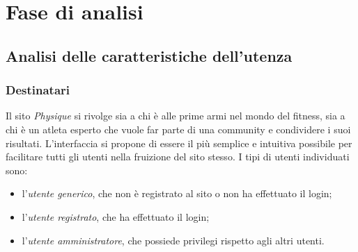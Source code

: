 \section{Fase di analisi}
\subsection{Analisi delle caratteristiche dell'utenza}
\label{sub:analisi_delle_caratteristiche_dell_utenza}
\subsubsection{Destinatari}
\label{subs:destinatari}
Il sito \emph{Physique} si rivolge sia a chi è alle prime armi nel mondo del fitness, sia a chi è un atleta esperto che vuole far parte di una community e condividere i suoi risultati. 
L'interfaccia si propone di essere il più semplice e intuitiva possibile per facilitare tutti gli utenti nella fruizione del sito stesso. I tipi di utenti individuati sono:
\begin{itemize}
    \item l'\textit{utente generico}, che non è registrato al sito o non ha effettuato il login;
    \item l'\textit{utente registrato}, che ha effettuato il login;
    \item l'\textit{utente amministratore}, che possiede privilegi rispetto agli altri utenti.
\end{itemize}

